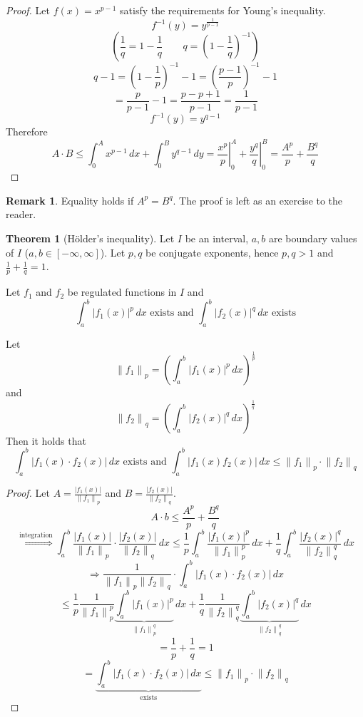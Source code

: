 \documentclass[a4paper,landscape,twocolumn]{article}
\theoremstyle{definition}
\newtheorem{theorem}{Theorem}
\newtheorem{rem}{Remark}
\newcommand\abs[1]{\left|#1\right|}
\newcommand\norm[1]{\left\|#1\right\|}
\begin{document}
\begin{proof}
  Let $f(x) = x^{p-1}$ satisfy the requirements for Young's inequality.
  \[ f^{-1}(y) = y^{\frac{1}{p-1}} \]
  \[ \left( \frac1q = 1 - \frac1q \qquad q = \left(1 - \frac1q\right)^{-1}\right) \]
  \[ q - 1 = \left(1 - \frac1p\right)^{-1} - 1 = \left(\frac{p-1}{p}\right)^{-1} - 1 \]
  \[ = \frac{p}{p-1} - 1 = \frac{p - p + 1}{p - 1} = \frac{1}{p-1} \]
  \[ f^{-1}(y) = y^{q-1} \]
  Therefore
  \[
    A \cdot B \leq \int_0^A x^{p-1} \, dx + \int_0^B y^{q-1} \, dy
    = \left.\frac{x^p}{p}\right|_0^A + \left.\frac{y^q}{q}\right|_0^B
    = \frac{A^p}{p} + \frac{B^q}{q}
  \]
\end{proof}
\begin{rem}
  Equality holds if $A^p = B^q$. The proof is left as an exercise to the reader.
\end{rem}

\begin{theorem}[Hölder's inequality]
  Let $I$ be an interval, $a, b$ are boundary values of $I$ ($a,b \in [-\infty, \infty]$).
  Let $p,q$ be conjugate exponents, hence $p,q > 1$ and $\frac1p + \frac1q = 1$.

  Let $f_1$ and $f_2$ be regulated functions in $I$ and
  \[ \int_a^b \abs{f_1(x)}^p \, dx \text{ exists and } \int_a^b \abs{f_2(x)}^q \, dx \text{ exists} \]

  Let
  \[ \norm{f_1}_p = \left(\int_a^b \abs{f_1(x)}^p \, dx\right)^{\frac1p} \]
  and
  \[ \norm{f_2}_q = \left(\int_a^b \abs{f_2(x)}^q \, dx\right)^{\frac1q} \]
  Then it holds that
  \[
    \int_a^b \abs{f_1(x) \cdot f_2(x)} \, dx \text{ exists and }
    \int_a^b \abs{f_1(x) f_2(x)} \, dx
    \leq \norm{f_1}_p \cdot \norm{f_2}_q
  \]
\end{theorem}
\begin{proof}
  Let $A = \frac{\abs{f_1(x)}}{\norm{f_1}_p}$ and $B = \frac{\abs{f_2(x)}}{\norm{f_2}_q}$.
  \[
    A \cdot b \leq \frac{A^p}{p} + \frac{B^q}{q}
  \] \[
    \overset{\text{integration}}{\Rightarrow}
    \int_a^b \frac{\abs{f_1(x)}}{\norm{f_1}_p} \cdot \frac{\abs{f_2(x)}}{\norm{f_2}_q} \, dx
    \leq \frac1p \int_a^b \frac{\abs{f_1(x)}^p}{\norm{f_1}_p^p} \, dx
    + \frac1q \int_a^b \frac{\abs{f_2(x)}^q}{\norm{f_2}_q^q} \, dx
  \] \[
    \Rightarrow \frac{1}{\norm{f_1}_p \norm{f_2}_q} \cdot
    \int_a^b \abs{f_1(x) \cdot f_2(x)} \, dx
  \] \[
    \leq \frac{1}{p} \frac{1}{\norm{f_1}_p^p} \underbrace{\int_a^b \abs{f_1(x)}^p}_{\norm{f_1}_p^q} \, dx
    + \frac1q \frac1{\norm{f_2}_q^q} \underbrace{\int_a^b \abs{f_2(x)}^q}_{\norm{f_2}_q^q} \, dx
  \] \[
    = \frac1p + \frac1q = 1
  \] \[
    = \underbrace{\int_a^b \abs{f_1(x) \cdot f_2(x)} \, dx}_{\text{exists}}
    \leq \norm{f_1}_p \cdot \norm{f_2}_q
  \]
\end{proof}
\end{document}
